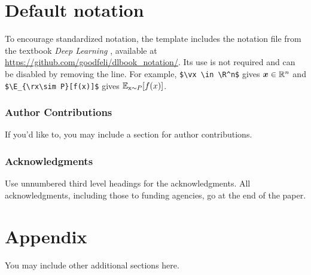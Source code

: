 \documentclass[10pt]{article} %
\begin{document}
\section{Default notation}

To encourage standardized notation, the template includes the notation file
from the textbook \textit{Deep Learning} \citep{goodfellow2016deep},
available at \url{https://github.com/goodfeli/dlbook_notation/}. Its use is
not required and can be disabled by removing the
\verb++ line. For example, \verb+$\vx \in \R^n$+
gives ${\bm{x}} \in \mathbb{R}^n$ and \verb+$\E_{\rx\sim P}[f(x)]$+ gives
$\mathbb{E}_{{\textnormal{x}}\sim P}[f(x)]$.

\subsubsection*{Author Contributions}
If you'd like to, you may include a section for author contributions.

\subsubsection*{Acknowledgments}
Use unnumbered third level headings for the acknowledgments. All
acknowledgments, including those to funding agencies, go at the end of the paper.




\appendix
\section{Appendix}
You may include other additional sections here.
\end{document}
